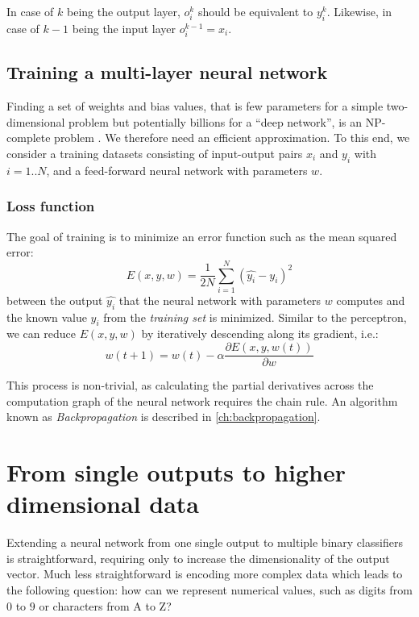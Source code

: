 In case of $k$ being the output layer, $o_i^k$ should be equivalent to $y_i^k$. Likewise, in case of $k-1$ being the input layer $o_i^{k-1}=x_i$.

\subsection{Training a multi-layer neural network}

Finding a set of weights and bias values, that is few parameters for a simple two-dimensional problem but potentially billions for a ``deep network'', is an NP-complete problem \cite{blum1992training}.
We therefore need an efficient approximation. To this end, we consider a training datasets consisting of input-output pairs $x_i$ and $y_i$ with $i=1..N$, and a feed-forward neural network with parameters $w$.

\subsubsection{Loss function}\label{sec:lossfunction}

The goal of training is to minimize an error function such as the mean squared error:
\begin{equation}
E(x,y,w)=\frac{1}{2N}\sum_{i=1}^{N}(\hat{y_i}-y_i)^2
\end{equation}
between the output $\hat{y_i}$ that the neural network with parameters $w$ computes and the known value $y_i$ from the \textsl{training set} is minimized.
%
Similar to the perceptron, we can reduce $E(x,y,w)$ by iteratively descending along its gradient, i.e.:
\begin{equation}
w(t+1)=w(t)-\alpha \frac{\partial E(x,y,w(t))}{\partial w}
\end{equation}

This process is non-trivial, as calculating the partial derivatives across the computation graph of the neural network requires the chain rule. An algorithm known as \textsl{Backpropagation} is described in \cref{ch:backpropagation}.


\section{From single outputs to higher dimensional data}

Extending a neural network from one single output to multiple binary classifiers is straightforward, requiring only to increase the dimensionality of the output vector.
Much less straightforward is encoding more complex data which leads to the following question: how can we represent numerical values, such as digits from $0$ to $9$ or characters from A to Z?


